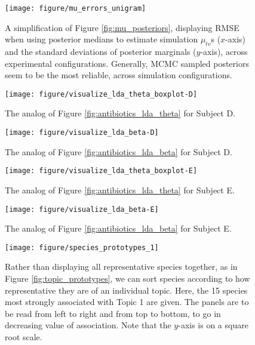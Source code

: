 \documentclass[oupdraft]{bio}
\begin{document}
\begin{figure}[ht]
  \centering
  \texttt{[image: figure/mu\_errors\_unigram]}
  \caption{A simplification of Figure \ref{fig:mu_posteriors}, displaying RMSE when
    using posterior medians to estimate simulation $\mu_{tv}$s ($x$-axis) and
    the standard deviations of posterior marginals ($y$-axis), across
    experimental configurations. Generally, MCMC sampled posteriors seem to be
    the most reliable, across simulation configurations.
    \label{fig:mu_errors_unigram}
  }
\end{figure}

\begin{figure}[!p]
  \centering\texttt{[image: figure/visualize\_lda\_theta\_boxplot-D]}
  \caption{The analog of Figure \ref{fig:antibiotics_lda_theta} for Subject
    D. \label{fig:antibiotics_lda_theta_D}}
\end{figure}

\begin{figure}[!p]
  \centering\texttt{[image: figure/visualize\_lda\_beta-D]}
  \caption{The analog of Figure \ref{fig:antibiotics_lda_beta} for Subject D.}
\end{figure}

\begin{figure}[!p]
  \centering\texttt{[image: figure/visualize\_lda\_theta\_boxplot-E]}
  \caption{The analog of Figure \ref{fig:antibiotics_lda_theta} for Subject E.}
\end{figure}

\begin{figure}[!p]
  \centering\texttt{[image: figure/visualize\_lda\_beta-E]}
  \caption{The analog of Figure \ref{fig:antibiotics_lda_beta} for Subject E. \label{fig:antibiotics_lda_beta_E}}
\end{figure}

\begin{figure}[!p]
  \centering
  \texttt{[image: figure/species\_prototypes\_1]}
  \caption{Rather than displaying all representative species together, as in
    Figure \ref{fig:topic_prototypes}, we can sort species according to how
    representative they are of an individual topic. Here, the 15 species most
    strongly associated with Topic 1 are given. The panels are to be read from
    left to right and from top to bottom, to go in decreasing value of
    association. Note that the $y$-axis is on a square root
    scale. \label{fig:species_prototypes_1} }
\end{figure}
\end{document}
